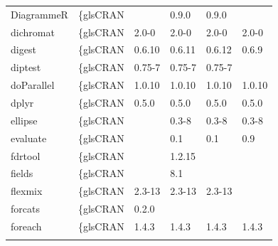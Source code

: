 \begin{longtable}{llllll}
DiagrammeR                    & \{gls{CRAN}                      &             & 0.9.0       & 0.9.0          &                    \\
\rowcolor{black!10}
dichromat                     & \{gls{CRAN}                      & 2.0-0       & 2.0-0       & 2.0-0          & 2.0-0             \\
\rowcolor{black!5}
digest                        & \{gls{CRAN}                      & 0.6.10      & 0.6.11      & 0.6.12         & 0.6.9              \\
\rowcolor{black!10}
diptest                       & \{gls{CRAN}                      & 0.75-7      & 0.75-7      & 0.75-7         &                   \\
\rowcolor{black!5}
doParallel                    & \{gls{CRAN}                      & 1.0.10      & 1.0.10      & 1.0.10         & 1.0.10             \\
\rowcolor{black!10}
dplyr                         & \{gls{CRAN}                      & 0.5.0       & 0.5.0       & 0.5.0          & 0.5.0             \\
\rowcolor{black!5}
ellipse                       & \{gls{CRAN}                      &             & 0.3-8       & 0.3-8          & 0.3-8              \\
\rowcolor{black!10}
evaluate                      & \{gls{CRAN}                      &             & 0.1         & 0.1            & 0.9               \\
\rowcolor{black!5}
fdrtool                       & \{gls{CRAN}                      &             & 1.2.15      &                &                    \\
\rowcolor{black!10}
fields                        & \{gls{CRAN}                      &             & 8.1         &                &                   \\
\rowcolor{black!5}
flexmix                       & \{gls{CRAN}                      & 2.3-13      & 2.3-13      & 2.3-13         &                    \\
\rowcolor{black!10}
forcats                       & \{gls{CRAN}                      & 0.2.0       &             &                &                   \\
\rowcolor{black!5}
foreach                       & \{gls{CRAN}                      & 1.4.3       & 1.4.3       & 1.4.3          & 1.4.3              \\
\rowcolor{black!10}

\end{longtable}
